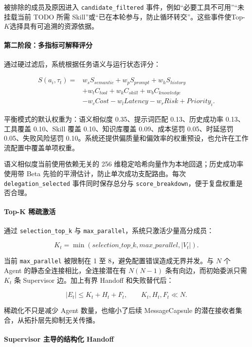 被排除的成员及原因进入 \texttt{candidate\_filtered} 事件，例如``必要工具不可用''``未挂载当前 TODO 所需 Skill''或``已在本轮参与，防止循环转交''。这些事件使Top-$K$选择具有可追溯的资源依据。

\paragraph{第二阶段：多指标可解释评分}

通过硬过滤后，系统根据任务语义与运行状态评分：

\[
\begin{aligned}
S(a_i,\tau_t)= {}&w_sS_{semantic}+w_pS_{prompt}+w_hS_{history}\\
&+w_tC_{tool}+w_kC_{skill}+w_bC_{knowledge}\\
&-w_cCost-w_lLatency-w_rRisk+Priority_i.
\end{aligned}
\]

平衡模式的默认权重为：语义相似度 0.35、提示词匹配 0.13、历史成功率 0.13、工具覆盖 0.10、Skill 覆盖 0.10、知识库覆盖 0.09、成本惩罚 0.05、时延惩罚 0.05、失败风险惩罚 0.10。系统还提供偏质量和偏效率的权重预设，也允许在工作流配置中覆盖单项权重。

语义相似度当前使用依赖无关的 256 维稳定哈希向量作为本地回退；历史成功率使用带 Beta 先验的平滑估计，防止单次成功支配路由。每次 \texttt{delegation\_selected} 事件同时保存总分与 \texttt{score\_breakdown}，便于复盘权重是否合理。

\paragraph{Top-K 稀疏激活}

通过 \texttt{selection\_top\_k} 与 \texttt{max\_parallel}，系统只激活少量高分成员：

\[
K_t=\min(selection\_top\_k,max\_parallel,|V_t|).
\]

当前 \texttt{max\_parallel} 被限制在 1 至 8，避免配置错误造成无界并发。与 \(N\) 个 Agent 的静态全连接相比，全连接潜在有 \(N(N-1)\) 条有向边，而初始委派只需 \(K_t\) 条 Supervisor 边。加上有界 Handoff 和失败替代后：

\[
|E_t|\le K_t+H_t+F_t,\qquad K_t,H_t,F_t\ll N.
\]

稀疏化不只是减少 Agent 数量，也缩小了后续 MessageCapsule 的潜在接收者集合，从拓扑层先抑制无关传播。


\paragraph{Supervisor 主导的结构化 Handoff}

